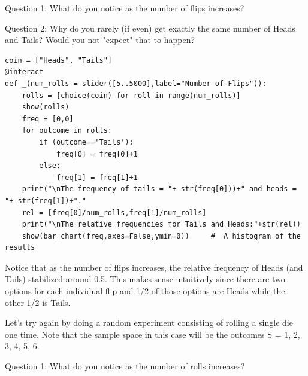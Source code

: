 \documentclass[10pt,]{book}
\theoremstyle{plain}
\theoremstyle{definition}
\theoremstyle{definition}
\numberwithin{equation}{section}
\begin{document}
Question 1: What do you notice as the number of flips increases?
%
\par

Question 2: Why do you rarely (if even) get exactly the same number of Heads and Tails? Would you not "expect"
that to happen?
%
\begin{lstlisting}[style=sageinput]
coin = ["Heads", "Tails"]
@interact
def _(num_rolls = slider([5..5000],label="Number of Flips")):
	rolls = [choice(coin) for roll in range(num_rolls)]
	show(rolls)   
	freq = [0,0]
	for outcome in rolls:
		if (outcome=='Tails'):
			freq[0] = freq[0]+1
		else:
			freq[1] = freq[1]+1
	print("\nThe frequency of tails = "+ str(freq[0]))+" and heads = "+ str(freq[1])+"."
	rel = [freq[0]/num_rolls,freq[1]/num_rolls]
	print("\nThe relative frequencies for Tails and Heads:"+str(rel))
	show(bar_chart(freq,axes=False,ymin=0))     #  A histogram of the results
\end{lstlisting}
\par
Notice that as the number of flips increases, the relative frequency of Heads (and Tails)
	stabilized around 0.5. This makes sense intuitively since there are two options for each 
	individual flip and 1/2 of those options are Heads while the other 1/2 is Tails.%
\par

	Let's try again
	by doing a random experiment consisting of rolling a single die one time. Note that the sample space 
	in this case will be the outcomes S = {1, 2, 3, 4, 5, 6}.
%
\par
%
\par

Question 1: What do you notice as the number of rolls increases?
%
\par
\end{document}
